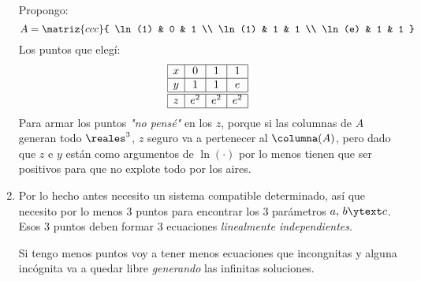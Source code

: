 \begin{enumerate}[label=\arabic*.]
        Propongo:
        $$
          A =
          \matriz{ccc}{
            \ln(1) & 0 & 1 \\
            \ln(1) & 1 & 1 \\
            \ln(e) & 1 & 1
          }
        $$
        Los puntos que elegí:
        $$
          \begin{array}{|c|c|c|c|}
            \hline
            x & 0   & 1   & 1   \\ \hline
            y & 1   & 1   & e   \\ \hline \hline
            z & e^2 & e^2 & e^2 \\ \hline
          \end{array}
        $$
        Para armar los puntos \textit{"no pensé"} en los $z$, porque si las columnas de $A$ generan todo $\reales^3$, $z$ seguro va a pertenecer
        al $\columna(A)$, pero dado que $z$ e $y$ están como argumentos de $\ln(\cdot)$ por lo menos tienen que ser positivos para que no explote
        todo por los aires.

  \item Por lo hecho antes necesito un sistema compatible determinado, así que necesito por lo menos 3 puntos para encontrar los 3 parámetros
      $a,\,b \ytext c$. Esos 3 puntos deben formar 3 ecuaciones \textit{linealmente independientes}.

        Si tengo menos puntos voy a tener menos ecuaciones que incongnitas y alguna incógnita va a quedar libre \textit{generando} las
        infinitas soluciones.
\end{enumerate}

\begin{aportes}
  \item {}
\end{aportes}
